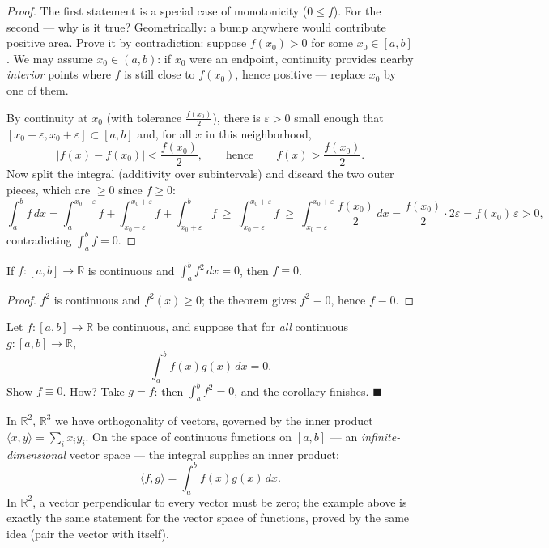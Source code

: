 \documentclass[11pt]{report}
\begin{document}
\begin{proof}
The first statement is a special case of monotonicity ($0 \leq f$). For the second --- why is it true? Geometrically: a bump anywhere would contribute positive area. Prove it by contradiction: suppose $f(x_0) > 0$ for some $x_0 \in [a,b]$. We may assume $x_0 \in (a,b)$: if $x_0$ were an endpoint, continuity provides nearby \emph{interior} points where $f$ is still close to $f(x_0)$, hence positive --- replace $x_0$ by one of them.

By continuity at $x_0$ (with tolerance $\tfrac{f(x_0)}{2}$), there is $\varepsilon > 0$ small enough that $[x_0 - \varepsilon, x_0 + \varepsilon] \subset [a,b]$ and, for all $x$ in this neighborhood,
\[
|f(x) - f(x_0)| < \frac{f(x_0)}{2}, \qquad \text{hence} \qquad f(x) > \frac{f(x_0)}{2}.
\]
Now split the integral (additivity over subintervals) and discard the two outer pieces, which are $\geq 0$ since $f \geq 0$:
\[
\int_a^b f\,dx = \int_a^{x_0-\varepsilon} f + \int_{x_0-\varepsilon}^{x_0+\varepsilon} f + \int_{x_0+\varepsilon}^b f
\ \geq\ \int_{x_0-\varepsilon}^{x_0+\varepsilon} f
\ \geq\ \int_{x_0-\varepsilon}^{x_0+\varepsilon} \frac{f(x_0)}{2}\,dx
= \frac{f(x_0)}{2}\cdot 2\varepsilon = f(x_0)\,\varepsilon > 0,
\]
contradicting $\int_a^b f = 0$.
\end{proof}

\begin{corbox}
If $f: [a,b] \to \mathbb{R}$ is continuous and $\int_a^b f^2\,dx = 0$, then $f \equiv 0$.
\end{corbox}

\begin{proof}
$f^2$ is continuous and $f^2(x) \geq 0$; the theorem gives $f^2 \equiv 0$, hence $f \equiv 0$.
\end{proof}

\begin{exbox}
Let $f: [a,b] \to \mathbb{R}$ be continuous, and suppose that for \emph{all} continuous $g: [a,b] \to \mathbb{R}$,
\[
\int_a^b f(x)g(x)\,dx = 0.
\]
Show $f \equiv 0$. How? Take $g = f$: then $\int_a^b f^2 = 0$, and the corollary finishes. \hfill $\blacksquare$
\end{exbox}

\begin{rembox}
In $\mathbb{R}^2$, $\mathbb{R}^3$ we have orthogonality of vectors, governed by the inner product $\langle x, y \rangle = \sum_i x_i y_i$. On the space of continuous functions on $[a,b]$ --- an \emph{infinite-dimensional} vector space --- the integral supplies an inner product:
\[
\langle f, g \rangle = \int_a^b f(x)g(x)\,dx.
\]
In $\mathbb{R}^2$, a vector perpendicular to every vector must be zero; the example above is exactly the same statement for the vector space of functions, proved by the same idea (pair the vector with itself).
\end{rembox}
\end{document}
